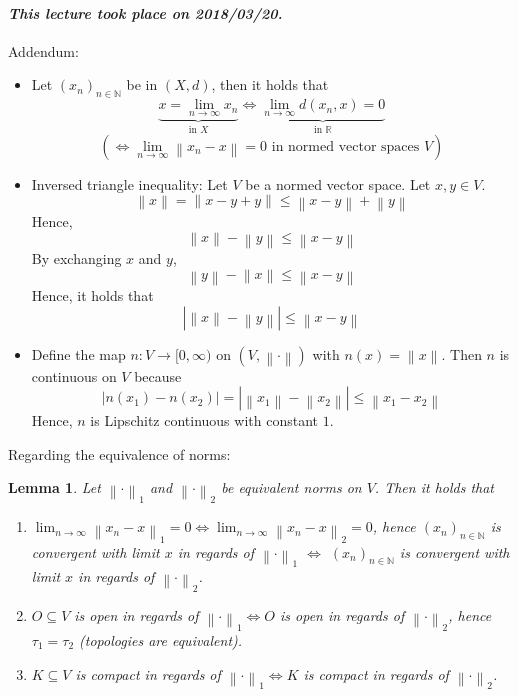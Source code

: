 \documentclass{article}
\newtheorem{lemma}{Lemma}  \numberwithin{lemma}{section}
\newcommand{\norm}[1]{\left\|#1\right\|}
\newcommand{\card}[1]{\left|#1\right|}
\newcommand{\dateref}[1]{\paragraph{\textit{This lecture took place on #1.}}}
\begin{document}
\dateref{2018/03/20}

Addendum:
\begin{itemize}
  \item Let $(x_n)_{n \in \mathbb N}$ be in $(X, d)$, then it holds that
    \[ \underbrace{x = \lim_{n\to\infty} x_n}_{\text{in } X} \iff \underbrace{\lim_{n\to\infty} d(x_n, x) = 0}_{\text{in } \mathbb R} \]
    \[ (\iff \lim_{n\to\infty} \norm{x_n - x} = 0 \text{ in normed vector spaces } V) \]
  \item Inversed triangle inequality: Let $V$ be a normed vector space. Let $x, y \in V$.
    \[ \norm{x} = \norm{x - y + y} \leq \norm{x - y} + \norm{y} \]
    Hence,
    \[ \norm{x} - \norm{y} \leq \norm{x - y} \]
    By exchanging $x$ and $y$,
    \[ \norm{y} - \norm{x} \leq \norm{x - y} \]
    Hence, it holds that
    \[ \card{\norm x - \norm y} \leq \norm{x - y} \]
  \item Define the map $n: V \to [0, \infty)$ on $(V, \norm{\cdot})$ with $n(x) = \norm{x}$.
    Then $n$ is continuous on $V$ because
    \[ \card{n(x_1) - n(x_2)} = \card{\norm{x_1} - \norm{x_2}} \leq \norm{x_1 - x_2} \]
    Hence, $n$ is Lipschitz continuous with constant $1$.
\end{itemize}

Regarding the equivalence of norms:

\begin{lemma} %
  Let $\norm{\cdot}_1$ and $\norm{\cdot}_2$ be equivalent norms on $V$. Then it holds that
  \begin{enumerate}
    \item $\lim_{n\to\infty} \norm{x_n - x}_1 = 0 \iff \lim_{n\to\infty} \norm{x_n - x}_2 = 0$,
      hence $(x_n)_{n\in\mathbb N}$ is convergent with limit $x$ in regards of $\norm{\cdot}_1$
      $\iff$ $(x_n)_{n\in\mathbb N}$ is convergent with limit $x$ in regards of $\norm{\cdot}_2$.
    \item $O \subseteq V$ is open in regards of $\norm{\cdot}_1 \iff O$ is open in regards of $\norm{\cdot}_2$,
      hence $\tau_1 = \tau_2$ (topologies are equivalent).
    \item $K \subseteq V$ is compact in regards of $\norm{\cdot}_1 \iff K$ is compact in regards of $\norm{\cdot}_2$.
  \end{enumerate}
\end{lemma}
\end{document}
